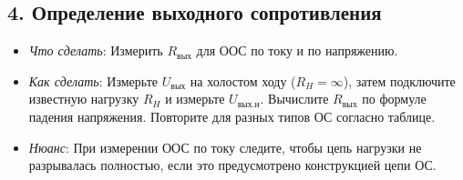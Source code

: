 \subsection*{4. Определение выходного сопротивления}
\begin{itemize}
    \item \textit{Что сделать}: Измерить $R_{вых}$ для ООС по току и по напряжению.
    \item \textit{Как сделать}: Измерьте $U_{вых}$ на холостом ходу ($R_H = \infty$), затем подключите известную нагрузку $R_H$ и измерьте $U_{вых.н}$. Вычислите $R_{вых}$ по формуле падения напряжения. Повторите для разных типов ОС согласно таблице.
    \item \textit{Нюанс}: При измерении ООС по току следите, чтобы цепь нагрузки не разрывалась полностью, если это предусмотрено конструкцией цепи ОС.
\end{itemize}







